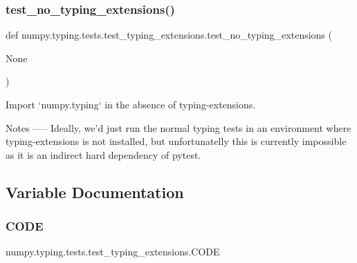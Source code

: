 \subsubsection{\texorpdfstring{test\+\_\+no\+\_\+typing\+\_\+extensions()}{test\_no\_typing\_extensions()}}
{\footnotesize\ttfamily def numpy.\+typing.\+tests.\+test\+\_\+typing\+\_\+extensions.\+test\+\_\+no\+\_\+typing\+\_\+extensions (\begin{DoxyParamCaption}\item[{}]{None }\end{DoxyParamCaption})}

\begin{DoxyVerb}Import `numpy.typing` in the absence of typing-extensions.

Notes
-----
Ideally, we'd just run the normal typing tests in an environment where
typing-extensions is not installed, but unfortunatelly this is currently
impossible as it is an indirect hard dependency of pytest.\end{DoxyVerb}
 

\subsection{Variable Documentation}
\mbox{\label{namespacenumpy_1_1typing_1_1tests_1_1test__typing__extensions_a0b48efb2f4614a2f8f513f2e7088f18b}} 
\subsubsection{\texorpdfstring{C\+O\+DE}{CODE}}
{\footnotesize\ttfamily numpy.\+typing.\+tests.\+test\+\_\+typing\+\_\+extensions.\+C\+O\+DE}

